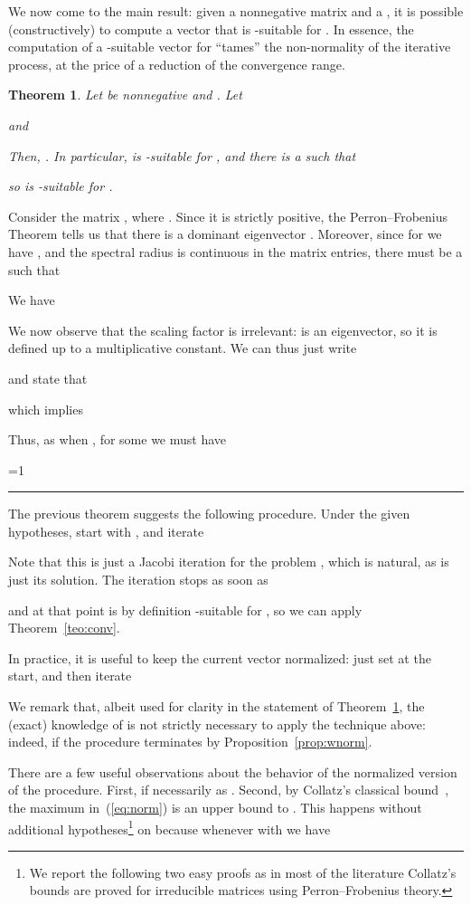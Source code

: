 \documentclass{article}
\newcommand{\1}{\mathbf 1}
\newtheorem{theorem}{Theorem}
\newcounter{noqed}
\newcommand{\qed}{ \ifmmode\mbox{ }\fi\rule[-.05em]{.3em}{.7em}\setcounter{noqed}{0}}
\newenvironment{proof}[1][{}]{\noindent{\bf Proof#1. }\setcounter{noqed}{1}}{\ifnum\value{noqed}=1\qed\fi\par\medskip}
\begin{document}
We now come to the main result: given a nonnegative matrix  
and a , it is possible (constructively) to compute a vector
 that is -suitable for . In essence, the
computation of a -suitable vector for  ``tames'' the
non-normality of the iterative process, at the price of a reduction of the
convergence range.

\begin{theorem}
\label{teo:suitable}
Let  be nonnegative and . Let

and

Then, . In particular,  is
-suitable for , and there is a  such that

so  is
-suitable for .
\end{theorem}
\begin{proof}
Consider the matrix , where . Since it is strictly
positive, the Perron--Frobenius Theorem tells us that there is a 
dominant eigenvector . Moreover, since for 
we have , and the spectral radius is continuous in the
matrix entries, there must be a  such that

We have

We now observe that the scaling factor is irrelevant:  is an
eigenvector, so it is defined up to a multiplicative constant. We can thus just write

and state that

which implies

Thus, as  when , for some
 we must have

\end{proof}

The previous theorem suggests the following procedure. Under the given
hypotheses, start with , and iterate

Note that this is just a Jacobi iteration for the problem , which is natural, as  is just its solution.
The iteration stops as soon as

and at that point  is by definition -suitable for , 
so we can apply Theorem~\ref{teo:conv}. 

In practice, it is useful to keep the current vector
 normalized: just set  at the start, and then iterate


We remark that, albeit used for clarity in the statement of Theorem~\ref{teo:suitable}, the (exact) knowledge of  is
not strictly necessary to apply the technique above: indeed, if the procedure terminates  by
Proposition~\ref{prop:wnorm}.  

There are a few useful observations about the behavior of the normalized
version of the procedure. First, if  necessarily  as
. Second, by Collatz's classical bound~\cite{ColECZM},
the maximum in~(\ref{eq:norm}) is an upper bound to . This happens
without additional hypotheses\footnote{We report the following two easy proofs
as in most of the literature Collatz's bounds are proved for irreducible
matrices using Perron--Frobenius theory.} on  because whenever  with  we have
\end{document}
